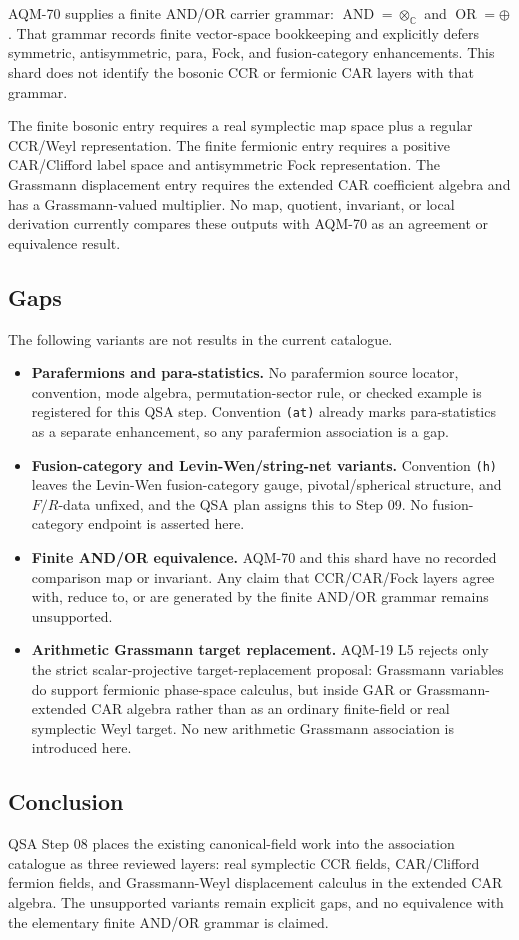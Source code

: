 AQM-70 supplies a finite AND/OR carrier grammar:
\(\operatorname{AND}=\otimes_{\mathbb C}\) and
\(\operatorname{OR}=\oplus\).  That grammar records finite vector-space
bookkeeping and explicitly defers symmetric, antisymmetric, para, Fock, and
fusion-category enhancements.  This shard does not identify the bosonic CCR
or fermionic CAR layers with that grammar.

The finite bosonic entry requires a real symplectic map space plus a regular
CCR/Weyl representation.  The finite fermionic entry requires a positive
CAR/Clifford label space and antisymmetric Fock representation.  The
Grassmann displacement entry requires the extended CAR coefficient algebra and
has a Grassmann-valued multiplier.  No map, quotient, invariant, or local
derivation currently compares these outputs with AQM-70 as an agreement or
equivalence result.

\subsection{Gaps}

The following variants are not results in the current catalogue.

\begin{itemize}
\item \textbf{Parafermions and para-statistics.}
No parafermion source locator, convention, mode algebra, permutation-sector
rule, or checked example is registered for this QSA step.  Convention
\texttt{(at)} already marks para-statistics as a separate enhancement, so any
parafermion association is a gap.
\item \textbf{Fusion-category and Levin-Wen/string-net variants.}
Convention \texttt{(h)} leaves the Levin-Wen fusion-category gauge,
pivotal/spherical structure, and \(F/R\)-data unfixed, and the QSA plan
assigns this to Step 09.  No fusion-category endpoint is asserted here.
\item \textbf{Finite AND/OR equivalence.}
AQM-70 and this shard have no recorded comparison map or invariant.  Any
claim that CCR/CAR/Fock layers agree with, reduce to, or are generated by the
finite AND/OR grammar remains unsupported.
\item \textbf{Arithmetic Grassmann target replacement.}
AQM-19 L5 rejects only the strict scalar-projective target-replacement
proposal: Grassmann variables do support fermionic phase-space calculus, but
inside GAR or Grassmann-extended CAR algebra rather than as an ordinary
finite-field or real symplectic Weyl target.  No new arithmetic Grassmann
association is introduced here.
\end{itemize}

\subsection{Conclusion}

QSA Step 08 places the existing canonical-field work into the association
catalogue as three reviewed layers: real symplectic CCR fields, CAR/Clifford
fermion fields, and Grassmann-Weyl displacement calculus in the extended CAR
algebra.  The unsupported variants remain explicit gaps, and no equivalence
with the elementary finite AND/OR grammar is claimed.
